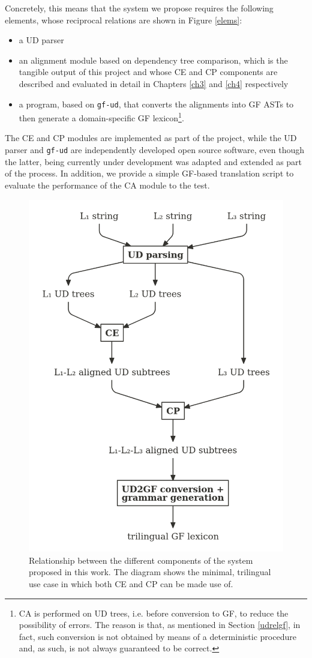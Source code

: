 Concretely, this means that the system we propose requires the following elements, whose reciprocal relations are shown in Figure \ref{elems}: \smallskip

\begin{itemize}
    \item a UD parser
    \item an alignment module based on dependency tree comparison, which is the tangible output of this project and whose CE and CP components are described and evaluated in detail in Chapters \ref{ch3} and \ref{ch4} respectively
    \item a program, based on \texttt{gf-ud}, that converts the alignments into GF ASTs to then generate a domain-specific GF lexicon\footnote{CA is performed on UD trees, i.e. before conversion to GF, to reduce the possibility of errors. The reason is that, as mentioned in Section \ref{udrelgf}, in fact, such conversion is not obtained by means of a deterministic procedure and, as such, is not always guaranteed to be correct.}.
\end{itemize} \smallskip

The CE and CP modules are implemented as part of the project, while the UD parser and \texttt{gf-ud} are independently developed open source software, even though the latter, being currently under development was adapted and extended as part of the process. 
In addition, we provide a simple GF-based translation script to evaluate the performance of the CA module to the test.

\begin{figure}[h]
    \centering
    \includegraphics[width=.6\linewidth]{figure/elems.png}
    \caption[Relationship between the different components of the CA system]{Relationship between the different components of the system proposed in this work. The diagram shows the minimal, trilingual use case in which both CE and CP can be made use of.} \label{elems}
    \label{sys}
\end{figure}
